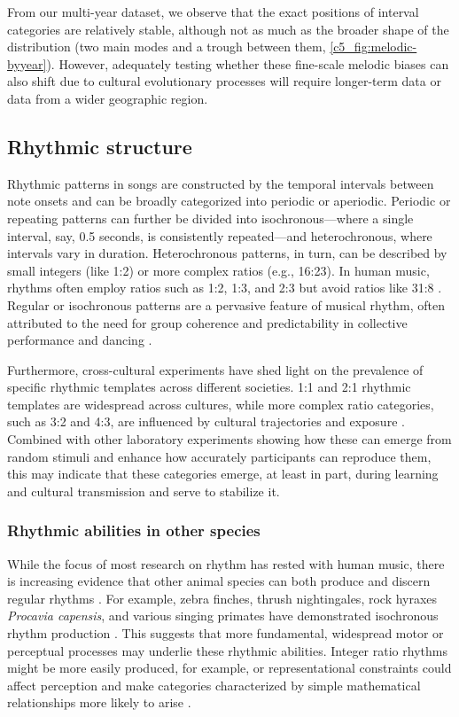 From our multi-year dataset, we observe that the exact positions of interval categories are relatively stable, although not as much as the broader shape of the distribution (two main modes and a trough between them, \autoref{c5_fig:melodic-byyear}). However, adequately testing whether these fine-scale melodic biases can also shift due to cultural evolutionary processes will require longer-term data or data from a wider geographic region.

\subsection{Rhythmic structure}

Rhythmic patterns in songs are constructed by the temporal intervals between note onsets and can be broadly categorized into periodic or aperiodic. Periodic or repeating patterns can further be divided into isochronous---where a single interval, say, 0.5 seconds, is consistently repeated---and heterochronous, where intervals vary in duration. Heterochronous patterns, in turn, can be described by small integers (like 1:2) or more complex ratios (e.g., 16:23). In human music, rhythms often employ ratios such as 1:2, 1:3, and 2:3 but avoid ratios like 31:8 \autocite{ravignani2014}. Regular or isochronous patterns are a pervasive feature of musical rhythm, often attributed to the need for group coherence and predictability in collective performance and dancing \autocite{kotz2018}. 

Furthermore, cross-cultural experiments have shed light on the prevalence of specific rhythmic templates across different societies. 1:1 and 2:1 rhythmic templates are widespread across cultures, while more complex ratio categories, such as 3:2 and 4:3, are influenced by cultural trajectories and exposure \autocite{polak2018, jacoby2017a, jacoby2021}. Combined with other laboratory experiments \autocite{ravignani2017a} showing how these can emerge from random stimuli and enhance how accurately participants can reproduce them, this may indicate that these categories emerge, at least in part, during learning and cultural transmission and serve to stabilize it.

\subsubsection{Rhythmic abilities in other species}
While the focus of most research on rhythm has rested with human music, there is increasing evidence that other animal species can both produce and discern regular rhythms \autocite{rouse2021, verga2022, vanderaa2015}. For example, zebra finches, thrush nightingales, rock hyraxes \textit{Procavia capensis}, and various singing primates have demonstrated isochronous rhythm production \autocite{roeske2020, norton2016, demartsev2023, degregorio2021, degregorio2023, raimondi2023}. This suggests that more fundamental, widespread motor or perceptual processes may underlie these rhythmic abilities. Integer ratio rhythms might be more easily produced, for example, or representational constraints could affect perception and make categories characterized by simple mathematical relationships more likely to arise \autocite{ravignani2018c, roeske2020, jacoby2017a}.

